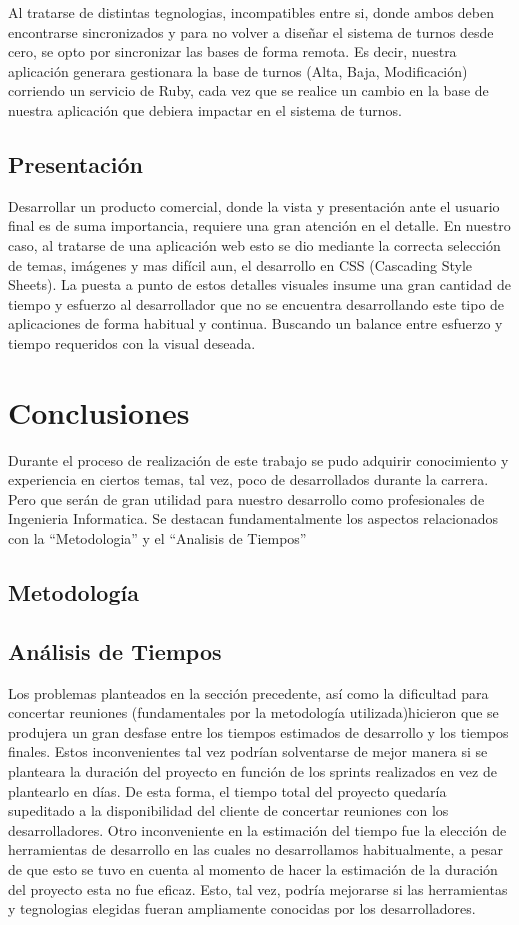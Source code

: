 \documentclass[runningheads,a4paper,spanish]{llncs}
\begin{document}
Al tratarse de distintas tegnologias, incompatibles entre si, donde ambos deben encontrarse sincronizados y para no volver a diseñar el sistema de turnos desde cero, se opto por sincronizar las bases de forma remota. Es decir, nuestra aplicación generara gestionara la base de turnos (Alta, Baja, Modificación) corriendo un servicio de Ruby, cada vez que se realice un cambio en la base de nuestra aplicación que debiera impactar en el sistema de turnos. 

\subsection{Presentación}
Desarrollar un producto comercial, donde la vista y presentación ante el usuario final es de suma importancia, requiere una gran atención en el detalle. En nuestro caso, al tratarse de una aplicación web esto se dio mediante la correcta selección de temas, imágenes y mas difícil aun, el desarrollo en CSS (Cascading Style Sheets). 
La puesta a punto de estos detalles visuales insume una gran cantidad de tiempo y esfuerzo al desarrollador que no se encuentra desarrollando este tipo de aplicaciones de forma habitual y continua. Buscando un balance entre esfuerzo y tiempo requeridos con la visual deseada.

\section{Conclusiones}
Durante el proceso de realización de este trabajo se pudo adquirir conocimiento y experiencia en ciertos temas, tal vez, poco de desarrollados durante la carrera. Pero que serán de gran utilidad para nuestro desarrollo como profesionales de Ingenieria Informatica. Se destacan fundamentalmente los aspectos relacionados con la "`Metodologia"' y el "`Analisis de Tiempos"'

\subsection{Metodología}


\subsection{Análisis de Tiempos}
Los problemas planteados en la sección precedente, así como la dificultad para concertar reuniones (fundamentales por la metodología utilizada)hicieron que se produjera un gran desfase entre los tiempos estimados de desarrollo y los tiempos finales. Estos inconvenientes tal vez podrían solventarse de mejor manera si se planteara la duración del proyecto en función de los sprints realizados en vez de plantearlo en días. De esta forma, el tiempo total del proyecto quedaría supeditado a la disponibilidad del cliente de concertar reuniones con los desarrolladores.
Otro inconveniente en la estimación del tiempo fue la elección de herramientas de desarrollo en las cuales no desarrollamos habitualmente, a pesar de que esto se tuvo en cuenta al momento de hacer la estimación de la duración del proyecto esta no fue eficaz. Esto, tal vez, podría mejorarse si las herramientas y tegnologias elegidas fueran ampliamente conocidas por los desarrolladores.
\end{document}
